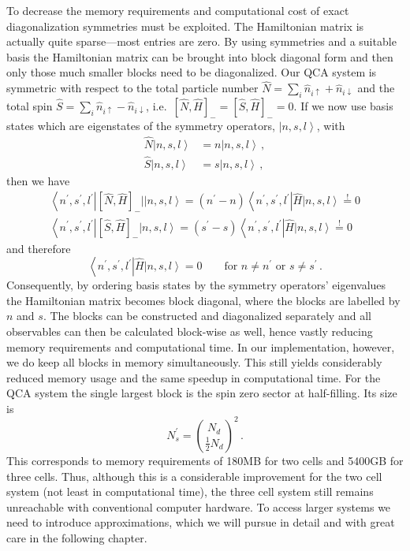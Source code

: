 \newcommand{\ket}[1]{\left|#1\right>}
\newcommand{\bra}[1]{\left<#1\right|}
%
To decrease the memory requirements and computational cost of
exact diagonalization symmetries must be exploited. The Hamiltonian matrix is
actually quite sparse---most entries are zero. By using symmetries and a
suitable basis the Hamiltonian matrix can be brought into block diagonal form
and then only those much smaller blocks need to be diagonalized. Our QCA system
is symmetric with respect to the total particle number $\hat{N} = \sum_i
\hat{n}_{i\uparrow} + \hat{n}_{i\downarrow}$ and the total spin $\hat{S} =
\sum_i \hat{n}_{i\uparrow} - \hat{n}_{i\downarrow}$, i.e.\ $[\hat{N},\hat{H}]_-
= [\hat{S},\hat{H}]_- = 0$. If we now use basis states which are eigenstates of
the symmetry operators, $\ket{n,s,l}$, with
%
\begin{equation}
\begin{split}
  \hat{N} \ket{n,s,l} &= n \ket{n,s,l} \, , \\
  \hat{S} \ket{n,s,l} &= s \ket{n,s,l} \, ,
\end{split}
\end{equation}
%
then we have
%
\begin{equation}
\begin{split}
  \bra{n^{\prime},s^{\prime},l^{\prime}} [\hat{N},\hat{H}]_- \ket{|n,s,l} = 
  (n^{\prime} - n) \bra{n^{\prime},s^{\prime},l^{\prime}} \hat{H} \ket{n,s,l}
  \stackrel{!}{=} 0 \\
  \bra{n^{\prime},s^{\prime},l^{\prime}} [\hat{S},\hat{H}]_- \ket{n,s,l} = 
  (s^{\prime} - s) \bra{n^{\prime},s^{\prime},l^{\prime}} \hat{H} \ket{n,s,l}
  \stackrel{!}{=} 0
\end{split}
\end{equation}
%
and therefore
%
\begin{equation}
  \bra{n^{\prime},s^{\prime},l^{\prime}} \hat{H} \ket{n,s,l} = 0 \qquad
  \textrm{for } n \ne n^{\prime} \textrm{ or } s \ne s^{\prime} \, .
\end{equation}
%
Consequently, by ordering basis states by the symmetry operators' eigenvalues
the Hamiltonian matrix becomes block diagonal, where the blocks are labelled by
$n$ and $s$. The blocks can be constructed and diagonalized separately and all
observables can then be calculated block-wise as well, hence vastly reducing
memory requirements and computational time. In our implementation, however, we
do keep all blocks in memory simultaneously. This still yields considerably
reduced memory usage and the same speedup in computational time. For the QCA system
the single largest block is the spin zero sector at half-filling. Its size is
%
\begin{equation}
  N_s^{\prime} = \binom{N_d}{\frac{1}{2} N_d}^2 \, .
\end{equation}
%
This corresponds to memory requirements of 180MB for two cells and 5400GB for
three cells. Thus, although this is a considerable improvement for the two cell
system (not least in computational time), the three cell system still remains
unreachable with conventional computer hardware.
%
To access larger systems we need to introduce approximations, which we will
pursue in detail and with great care in the following chapter.

